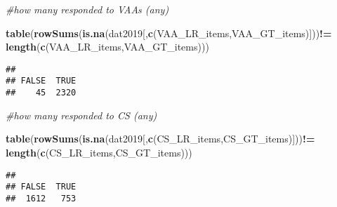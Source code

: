 \documentclass[
]{article}
\newenvironment{Shaded}{\begin{snugshade}}{\end{snugshade}}
\newcommand{\CommentTok}[1]{\textcolor[rgb]{0.56,0.35,0.01}{\textit{#1}}}
\newcommand{\KeywordTok}[1]{\textcolor[rgb]{0.13,0.29,0.53}{\textbf{#1}}}
\newcommand{\NormalTok}[1]{#1}
\newcommand{\OperatorTok}[1]{\textcolor[rgb]{0.81,0.36,0.00}{\textbf{#1}}}
\newcommand{\StringTok}[1]{\textcolor[rgb]{0.31,0.60,0.02}{#1}}
\begin{document}
\begin{Shaded}
\begin{Highlighting}[]
\CommentTok{#how many responded to VAAs (any)}

\KeywordTok{table}\NormalTok{(}\KeywordTok{rowSums}\NormalTok{(}\KeywordTok{is.na}\NormalTok{(dat2019[,}\KeywordTok{c}\NormalTok{(VAA_LR_items,VAA_GT_items)]))}\OperatorTok{!=}
\StringTok{        }\KeywordTok{length}\NormalTok{(}\KeywordTok{c}\NormalTok{(VAA_LR_items,VAA_GT_items)))}
\end{Highlighting}
\end{Shaded}

\begin{verbatim}
## 
## FALSE  TRUE 
##    45  2320
\end{verbatim}

\begin{Shaded}
\begin{Highlighting}[]
\CommentTok{#how many responded to CS (any)}

\KeywordTok{table}\NormalTok{(}\KeywordTok{rowSums}\NormalTok{(}\KeywordTok{is.na}\NormalTok{(dat2019[,}\KeywordTok{c}\NormalTok{(CS_LR_items,CS_GT_items)]))}\OperatorTok{!=}
\StringTok{        }\KeywordTok{length}\NormalTok{(}\KeywordTok{c}\NormalTok{(CS_LR_items,CS_GT_items)))}
\end{Highlighting}
\end{Shaded}

\begin{verbatim}
## 
## FALSE  TRUE 
##  1612   753
\end{verbatim}
\end{document}
